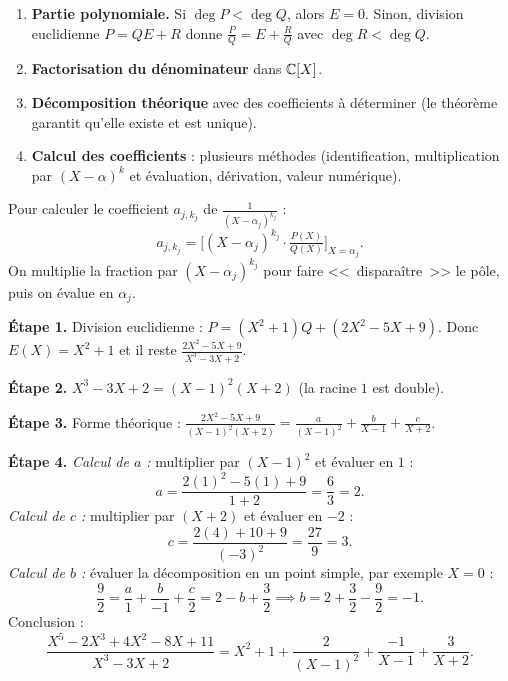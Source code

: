 \begin{methodbox}
\begin{enumerate}[leftmargin=1.5cm]
  \item \textbf{Partie polynomiale.} Si $\deg P < \deg Q$, alors $E = 0$. Sinon, division euclidienne $P = QE + R$ donne $\frac{P}{Q} = E + \frac{R}{Q}$ avec $\deg R < \deg Q$.
  \item \textbf{Factorisation du dénominateur} dans $\mathbb{C}[X]$.
  \item \textbf{Décomposition théorique} avec des coefficients à déterminer (le théorème garantit qu'elle existe et est unique).
  \item \textbf{Calcul des coefficients} : plusieurs méthodes (identification, multiplication par $(X - \alpha)^k$ et évaluation, dérivation, valeur numérique).
\end{enumerate}
\end{methodbox}

\begin{methodbox}
Pour calculer le coefficient $a_{j, k_j}$ de $\frac{1}{(X - \alpha_j)^{k_j}}$ :
\[
  a_{j, k_j} = \bigl[(X - \alpha_j)^{k_j} \cdot \tfrac{P(X)}{Q(X)}\bigr]_{X = \alpha_j}.
\]
On multiplie la fraction par $(X - \alpha_j)^{k_j}$ pour faire <<~disparaître~>> le pôle, puis on évalue en $\alpha_j$.
\end{methodbox}

\begin{exbox}
\textbf{Étape 1.} Division euclidienne : $P = (X^2 + 1) Q + (2X^2 - 5X + 9)$. Donc $E(X) = X^2 + 1$ et il reste $\frac{2X^2 - 5X + 9}{X^3 - 3X + 2}$.

\textbf{Étape 2.} $X^3 - 3X + 2 = (X - 1)^2 (X + 2)$ (la racine $1$ est double).

\textbf{Étape 3.} Forme théorique : $\frac{2X^2 - 5X + 9}{(X-1)^2 (X+2)} = \frac{a}{(X-1)^2} + \frac{b}{X-1} + \frac{c}{X+2}$.

\textbf{Étape 4.} \emph{Calcul de $a$ :} multiplier par $(X-1)^2$ et évaluer en $1$ :
\[
  a = \frac{2(1)^2 - 5(1) + 9}{1 + 2} = \frac{6}{3} = 2.
\]
\emph{Calcul de $c$ :} multiplier par $(X+2)$ et évaluer en $-2$ :
\[
  c = \frac{2(4) + 10 + 9}{(-3)^2} = \frac{27}{9} = 3.
\]
\emph{Calcul de $b$ :} évaluer la décomposition en un point simple, par exemple $X = 0$ :
\[
  \frac{9}{2} = \frac{a}{1} + \frac{b}{-1} + \frac{c}{2} = 2 - b + \frac{3}{2} \implies b = 2 + \frac{3}{2} - \frac{9}{2} = -1.
\]
Conclusion :
\[
  \frac{X^5 - 2X^3 + 4X^2 - 8X + 11}{X^3 - 3X + 2} = X^2 + 1 + \frac{2}{(X-1)^2} + \frac{-1}{X-1} + \frac{3}{X+2}.
\]
\end{exbox}

